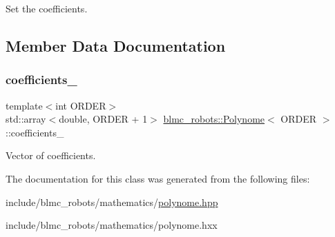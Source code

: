 Set the coefficients. 

\subsection{Member Data Documentation}
\mbox{\label{classblmc__robots_1_1Polynome_a975d6e6bbcbc05f1a31a5237f28b7bee}} 
\subsubsection{\texorpdfstring{coefficients\+\_\+}{coefficients\_}}
{\footnotesize\ttfamily template$<$int O\+R\+D\+ER$>$ \\
std\+::array$<$double, O\+R\+D\+ER + 1$>$ \hyperlink{classblmc__robots_1_1Polynome}{blmc\+\_\+robots\+::\+Polynome}$<$ O\+R\+D\+ER $>$\+::coefficients\+\_\+\hspace{0.3cm}{\ttfamily [protected]}}

Vector of coefficients. 

The documentation for this class was generated from the following files\+:\begin{DoxyCompactItemize}
\item 
include/blmc\+\_\+robots/mathematics/\hyperlink{polynome_8hpp}{polynome.\+hpp}\item 
include/blmc\+\_\+robots/mathematics/polynome.\+hxx\end{DoxyCompactItemize}
